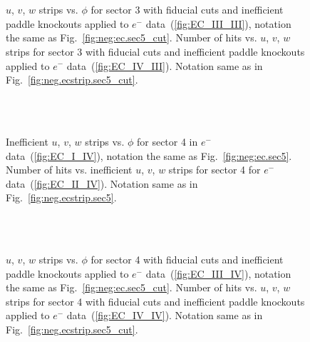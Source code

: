 \begin{figure}[!ht]
  \centering
   \quad
  \\
   \\

      \caption { $u$, $v$, $w$ strips vs. $\phi$ for sector 3 with fiducial cuts and inefficient paddle knockouts applied to $e^-$ data~(\ref{fig:EC_III_III}), notation the same as Fig.~\ref{fig:neg:ec.sec5_cut}. Number of hits vs.  $u$, $v$, $w$ strips for sector 3 with fiducial cuts and inefficient paddle knockouts applied to $e^-$ data~(\ref{fig:EC_IV_III}). Notation same as in Fig.~\ref{fig:neg.ecstrip.sec5_cut}.}
        \label{fig:EC_cut_III}
\end{figure}


\begin{figure}[!ht]
  \centering
   \quad
  \\
   \\

      \caption {Inefficient  $u$, $v$, $w$ strips vs. $\phi$ for sector 4 in  $e^{-} \ $ data~(\ref{fig:EC_I_IV}), notation the same as Fig.~\ref{fig:neg:ec.sec5}. Number of hits vs. inefficient  $u$, $v$, $w$ strips for sector 4 for $e^-$ data~(\ref{fig:EC_II_IV}). Notation same as in Fig.~\ref{fig:neg.ecstrip.sec5}.}
        \label{fig:EC_no_IV}
\end{figure}



\begin{figure}[!ht]
  \centering
   \quad
  \\
   \\

      \caption { $u$, $v$, $w$ strips vs. $\phi$ for sector 4 with fiducial cuts and inefficient paddle knockouts applied to $e^-$ data~(\ref{fig:EC_III_IV}), notation the same as Fig.~\ref{fig:neg:ec.sec5_cut}. Number of hits vs.  $u$, $v$, $w$ strips for sector 4 with fiducial cuts and inefficient paddle knockouts applied to $e^-$ data~(\ref{fig:EC_IV_IV}). Notation same as in Fig.~\ref{fig:neg.ecstrip.sec5_cut}.}
        \label{fig:EC_cut_IV}
\end{figure}


